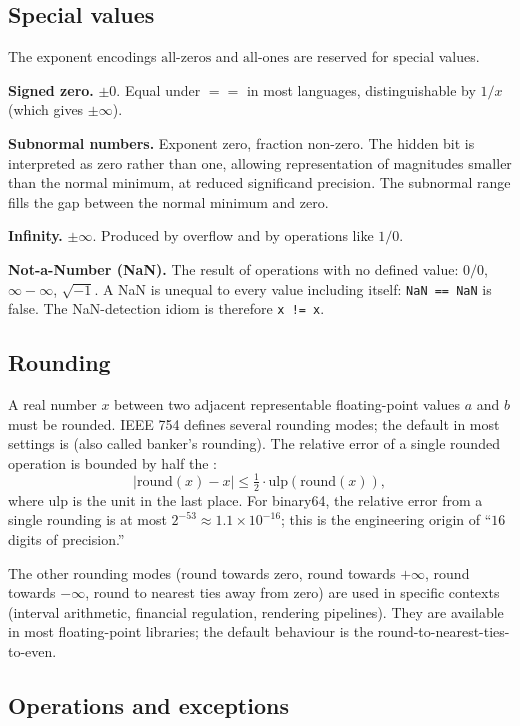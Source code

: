 \subsection{Special values}

The exponent encodings $\text{all-zeros}$ and $\text{all-ones}$ are reserved for special values.

\textbf{Signed zero.} $\pm 0$. Equal under $==$ in most languages, distinguishable by $1/x$ (which gives $\pm\infty$).

\textbf{Subnormal numbers.} Exponent zero, fraction non-zero. The hidden bit is interpreted as zero rather than one, allowing representation of magnitudes smaller than the normal minimum, at reduced significand precision. The subnormal range fills the gap between the normal minimum and zero.

\textbf{Infinity.} $\pm\infty$. Produced by overflow and by operations like $1/0$.

\textbf{Not-a-Number (NaN).} The result of operations with no defined value: $0/0$, $\infty - \infty$, $\sqrt{-1}$. A NaN is unequal to every value including itself: \texttt{NaN == NaN} is false. The NaN-detection idiom is therefore \texttt{x != x}.

\subsection{Rounding}

A real number $x$ between two adjacent representable floating-point values $a$ and $b$ must be rounded. IEEE 754 defines several rounding modes; the default in most settings is  (also called banker's rounding). The relative error of a single rounded operation is bounded by half the :
\[
\left| \mathrm{round}(x) - x \right| \leq \tfrac{1}{2} \cdot \mathrm{ulp}(\mathrm{round}(x)),
\]
where ulp is the unit in the last place. For binary64, the relative error from a single rounding is at most $2^{-53} \approx 1.1 \times 10^{-16}$; this is the engineering origin of ``$16$ digits of precision.''

The other rounding modes (round towards zero, round towards $+\infty$, round towards $-\infty$, round to nearest ties away from zero) are used in specific contexts (interval arithmetic, financial regulation, rendering pipelines). They are available in most floating-point libraries; the default behaviour is the round-to-nearest-ties-to-even.

\subsection{Operations and exceptions}

